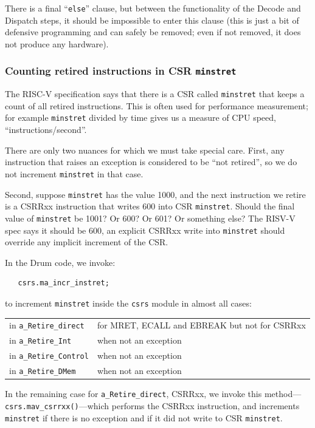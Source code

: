 There is a final ``\verb|else|'' clause, but between the functionality
of the Decode and Dispatch steps, it should be impossible to enter
this clause (this is just a bit of defensive programming and can
safely be removed; even if not removed, it does not produce any
hardware).


\subsubsection{Counting retired instructions in CSR {\tt minstret}}

The RISC-V specification says that there is a CSR called
\verb|minstret| that keeps a count of all retired instructions.  This
is often used for performance measurement; for example \verb|minstret|
divided by time gives us a measure of CPU speed,
``instructions/second''.

There are only two nuances for which we must take special care.
First, any instruction that raises an exception is considered to be
``not retired'', so we do not increment \verb|minstret| in that case.

Second, suppose \verb|minstret| has the value 1000, and the next
instruction we retire is a CSRRxx instruction that writes 600 into CSR
\verb|minstret|.  Should the final value of \verb|minstret| be 1001?
Or 600? Or 601? Or something else?  The RISV-V spec says it should be
600, {\ie} an explicit CSRRxx write into \verb|minstret| should
override any implicit increment of the CSR.

In the Drum code, we invoke:

{\small
\begin{Verbatim}
   csrs.ma_incr_instret;
\end{Verbatim}
}

to increment \verb|minstret| inside the \verb|csrs| module in almost
all cases:

\hmm
\begin{tabular}{ll}
 in {\tt a\_Retire\_direct}   & for MRET, ECALL and EBREAK but not for CSRRxx \\
 in {\tt a\_Retire\_Int}      & when not an exception \\
 in {\tt a\_Retire\_Control}  & when not an exception \\
 in {\tt a\_Retire\_DMem}     & when not an exception
\end{tabular}

In the remaining case for {\tt a\_Retire\_direct}, CSRRxx, we invoke
this method---{\tt csrs.mav\_csrrxx()}---which performs the CSRRxx
instruction, and increments \verb|minstret| if there is no exception
and if it did not write to CSR \verb|minstret|.

